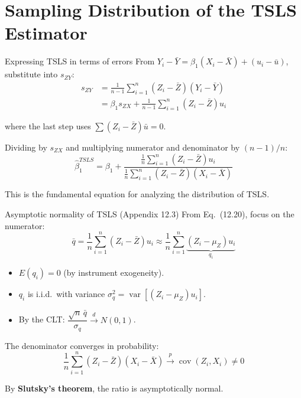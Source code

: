 \documentclass[10pt]{beamer}
\begin{document}
\section{Sampling Distribution of the TSLS Estimator}

\begin{frame}{Expressing TSLS in terms of errors}
\label{slide:tsls_errors}
From $Y_i - \bar{Y} = \beta_1(X_i - \bar{X}) + (u_i - \bar{u})$, substitute into $s_{ZY}$:
\begin{align*}
s_{ZY} &= \frac{1}{n-1}\sum_{i=1}^n (Z_i - \bar{Z})(Y_i - \bar{Y}) \\
       &= \beta_1 s_{ZX} + \frac{1}{n-1}\sum_{i=1}^n (Z_i - \bar{Z})u_i
\end{align*}

\pause
where the last step uses $\sum(Z_i - \bar{Z})\bar{u} = 0$.

Dividing by $s_{ZX}$ and multiplying numerator and denominator by $(n{-}1)/n$:
\[
\boxed{\widehat{\beta}_1^{TSLS} = \beta_1 + \frac{\frac{1}{n}\sum_{i=1}^n (Z_i - \bar{Z})u_i}{\frac{1}{n}\sum_{i=1}^n (Z_i - \bar{Z})(X_i - \bar{X})}} \tag{12.20}
\]

This is the fundamental equation for analyzing the distribution of TSLS.
\end{frame}

\begin{frame}{Asymptotic normality of TSLS (Appendix 12.3)}
\label{slide:asymptotic_normality}
From Eq.\ (12.20), focus on the \alert{numerator}:
\[
\bar{q} = \frac{1}{n}\sum_{i=1}^n (Z_i - \bar{Z})u_i \approx \frac{1}{n}\sum_{i=1}^n \underbrace{(Z_i - \mu_Z)u_i}_{q_i}
\]

\pause
\begin{itemize}
  \item $E(q_i) = 0$ \quad (by instrument exogeneity).
  \item $q_i$ is i.i.d.\ with variance $\sigma_q^2 = \operatorname{var}[(Z_i - \mu_Z)u_i]$.
  \item By the \alert{CLT}: $\dfrac{\sqrt{n}\,\bar{q}}{\sigma_q} \xrightarrow{d} N(0,1)$.
\end{itemize}

\pause
The \alert{denominator} converges in probability:
\[
\frac{1}{n}\sum_{i=1}^n (Z_i - \bar{Z})(X_i - \bar{X}) \xrightarrow{p} \operatorname{cov}(Z_i, X_i) \neq 0
\]

By \textbf{Slutsky's theorem}, the ratio is asymptotically normal.
\end{frame}
\end{document}
